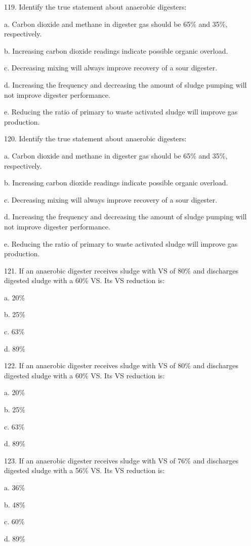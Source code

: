 \documentclass{article}
\begin{document}
119. Identify the true statement about anaerobic digesters: 

a. Carbon dioxide and methane in digester gas should be 65\% and 35\%, respectively. 

b. Increasing carbon dioxide readings indicate possible organic overload. 

c. Decreasing mixing will always improve recovery of a sour digester. 

d. Increasing the frequency and decreasing the amount of sludge pumping will not improve digester performance. 

e. Reducing the ratio of primary to waste activated sludge will improve gas production. 


120. Identify the true statement about anaerobic digesters: 

a. Carbon dioxide and methane in digester gas should be 65\% and 35\%, respectively. 

b. Increasing carbon dioxide readings indicate possible organic overload. 

c. Decreasing mixing will always improve recovery of a sour digester. 

d. Increasing the frequency and decreasing the amount of sludge pumping will not improve digester performance. 

e. Reducing the ratio of primary to waste activated sludge will improve gas production. 


121. If an anaerobic digester receives sludge with VS of 80\% and discharges digested sludge with a 60\% VS. Its VS reduction is: 

a. 20\% 

b. 25\% 

c. 63\% 

d. 89\% 


122. If an anaerobic digester receives sludge with VS of 80\% and discharges digested sludge with a 60\% VS. Its VS reduction is: 

a. 20\% 

b. 25\% 

c. 63\% 

d. 89\% 


123. If an anaerobic digester receives sludge with VS of 76\% and discharges digested sludge with a 56\% VS. Its VS reduction is: 

a. 36\% 

b. 48\% 

c. 60\% 

d. 89\% 
\end{document}
